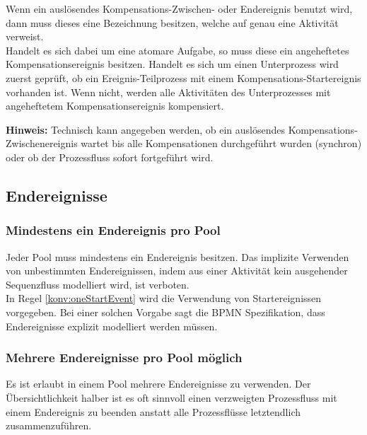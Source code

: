 \documentclass[12pt,report]{snetTeaching}
\begin{document}
Wenn ein auslösendes Kompensations-Zwischen- oder Endereignis benutzt wird, dann muss dieses eine Bezeichnung besitzen, welche auf genau eine  Aktivität verweist. \\
Handelt es sich dabei um eine atomare Aufgabe, so muss diese ein angeheftetes Kompensationsereignis besitzen. 
Handelt es sich um einen Unterprozess wird zuerst geprüft, ob ein Ereignis-Teilprozess mit einem Kompensations-Startereignis vorhanden ist. Wenn nicht, werden alle Aktivitäten des Unterprozesses mit angeheftetem Kompensationsereignis kompensiert.

\begin{Rahmen}
\end{Rahmen}

\textbf{Hinweis:} Technisch kann angegeben werden, ob ein auslösendes Kompensations-Zwischenereignis wartet bis alle Kompensationen durchgeführt wurden (synchron) oder ob der Prozessfluss sofort fortgeführt wird.


\clearpage
\subsection{Endereignisse}

\subsubsection{Mindestens ein Endereignis pro Pool}

Jeder Pool muss mindestens ein Endereignis besitzen. Das implizite Verwenden von unbestimmten Endereignissen, indem aus einer Aktivität kein ausgehender Sequenzfluss modelliert wird, ist verboten. \\
In Regel \ref{konv:oneStartEvent} wird die Verwendung von Startereignissen vorgegeben. Bei einer solchen Vorgabe sagt die BPMN Spezifikation, dass Endereignisse explizit modelliert werden müssen. 

\begin{Rahmen}
	\hfill
\end{Rahmen}

\subsubsection{Mehrere Endereignisse pro Pool möglich}

Es ist erlaubt in einem Pool mehrere Endereignisse zu verwenden. Der Übersichtlichkeit halber ist es oft sinnvoll einen verzweigten Prozessfluss mit einem Endereignis zu beenden anstatt alle Prozessflüsse letztendlich zusammenzuführen.
\end{document}
